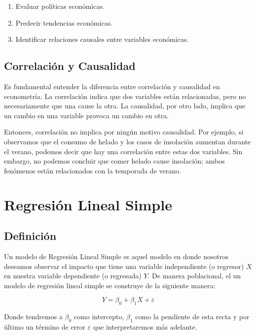 \documentclass[
]{book}
\providecommand{\tightlist}{%
  \setlength{\itemsep}{0pt}\setlength{\parskip}{0pt}}
\begin{document}
\begin{enumerate}
\def\labelenumi{\arabic{enumi}.}
\tightlist
\item
  Evaluar políticas económicas.
\item
  Predecir tendencias económicas.
\item
  Identificar relaciones causales entre variables económicas.
\end{enumerate}

\section*{Correlación y Causalidad}\label{correlaciuxf3n-y-causalidad}

Es fundamental entender la diferencia entre correlación y causalidad en econometría. La correlación indica que dos variables están relacionadas, pero no necesariamente que una cause la otra. La causalidad, por otro lado, implica que un cambio en una variable provoca un cambio en otra.

Entonces, correlación no implica por ningún motivo causalidad. Por ejemplo, si observamos que el consumo de helado y los casos de insolación aumentan durante el verano, podemos decir que hay una correlación entre estas dos variables. Sin embargo, no podemos concluir que comer helado cause insolación; ambos fenómenos están relacionados con la temporada de verano.

\chapter{Regresión Lineal Simple}\label{regresiuxf3n-lineal-simple}

\section{Definición}\label{definiciuxf3n}

Un modelo de Regresión Lineal Simple es aquel modelo en donde nosotros deseamos observar el impacto que tiene una variable independiente (o regresor) \(X\) en nuestra variable dependiente (o regresada) \(Y\). De manera poblacional, el un modelo de regresión lineal simple se construye de la siguiente manera:

\[
Y = \beta_0 + \beta_1X + \varepsilon
\]

Donde tendremos a \(\beta_0\) como intercepto, \(\beta_1\) como la pendiente de esta recta y por último un término de error \(\varepsilon\) que interpretaremos más adelante.
\end{document}
